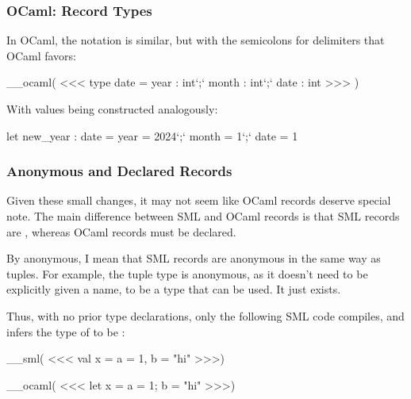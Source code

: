 \documentclass[aspectratio=169, handout]{beamer}
\begin{document}
\begin{frame}[fragile]
  \frametitle{OCaml: Record Types}

  In OCaml, the notation is similar, but with the semicolons for delimiters that
  OCaml favors:

  \vspace{\fill}

__ocaml(
<<<
  type date = {
    year  : int`;`
    month : int`;`
    date  : int
  }
>>>
)

  \vspace{\fill}

  With values being constructed analogously:

  \vspace{\fill}

  \begin{codeblock}
    let new_year : date = { year = 2024`;` month = 1`;` date = 1 }
  \end{codeblock}
\end{frame}

\begin{frame}[fragile]
  \frametitle{Anonymous and Declared Records}

  Given these small changes, it may not seem like OCaml records deserve special
  note. The main difference between SML and OCaml records is that SML records
  are , whereas OCaml records must be declared.

  \vspace{\fill}

  By anonymous, I mean that SML records are anonymous in the same way as tuples.
  For example, the tuple type  is anonymous, as it doesn't need to
  be explicitly given a name, to be a type that can be used. It just exists.

  \vspace{\fill}

  Thus, with no prior type declarations, only the following SML code compiles, and
  infers the type of  to be :

  \vspace{\fill}

__sml(
<<<
val x = {a = 1, b = "hi"}
>>>)

  \vspace{\fill}
__ocaml(
<<<
let x = {a = 1; b = "hi"}
>>>)
\end{frame}
\end{document}
